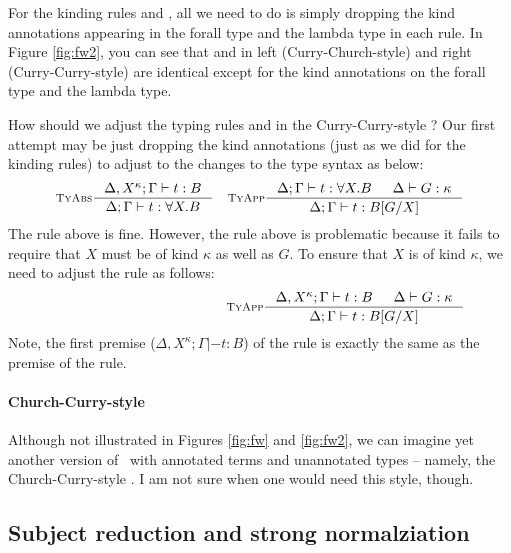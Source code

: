 For the kinding rules  and , all we need to do
is simply dropping the kind annotations appearing in the forall type and
the lambda type in each rule. In Figure \ref{fig:fw2}, you can see that
 and  in left (Curry-Church-style) and
right (Curry-Curry-style) are identical except for the kind annotations on
the forall type and the lambda type.

How should we adjust the typing rules  and 
in the Curry-Curry-style \Fw? Our first attempt may be just dropping
the kind annotations (just as we did for the kinding rules) to adjust to
the changes to the type syntax as below:
\begin{align*}
& \inference[\sc TyAbs]{\Delta,X^\kappa;\Gamma |- t : B}
		       {\Delta;\Gamma |- t : \forall X.B}
& \inference[\sc TyApp]{\Delta;\Gamma |- t : \forall X.B & \Delta |- G:\kappa}
		       {\Delta;\Gamma |- t : B[G/X]}
\end{align*}
The  rule above is fine. However, the  rule
above is problematic because it fails to require that $X$ must be of kind
$\kappa$ as well as $G$. To ensure that $X$ is of kind $\kappa$, we need to
adjust the  rule as follows:
\begin{align*}
& \phantom{ \inference[\sc TyAbs]{\Delta,X^\kappa;\Gamma |- t : B}
                                 {\Delta;\Gamma |- t : \forall X.B} }
& \inference[\sc TyApp]{\Delta,X^\kappa;\Gamma |- t : B & \Delta |- G:\kappa}
			{\Delta;\Gamma |- t : B[G/X]}
\end{align*}
Note, the first premise ($\Delta,X^\kappa;\Gamma |- t : B$) of
the  rule is exactly the same as the premise of
the  rule.

\paragraph{Church-Curry-style \Fw}
Although not illustrated in Figures \ref{fig:fw} and \ref{fig:fw2},
we can imagine yet another version of \Fw\ with annotated terms
and unannotated types -- namely, the Church-Curry-style \Fw.
I am not sure when one would need this style, though.



\subsection{Subject reduction and strong normalziation}\label{sec:f:srsn}

